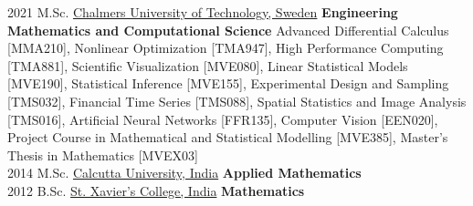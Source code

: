 \documentclass[letterpaper]{templatecv} %
\begin{document}
\begin{twenty} 
	\twentyitem
    	{2021}%
        {}%
        {M.Sc.}
        {\href{https://www.chalmers.se/en/Pages/default.aspx}{Chalmers University of Technology, Sweden}}
        {\textbf{Engineering Mathematics and Computational Science}}
        {Advanced Differential Calculus [MMA210], Nonlinear Optimization [TMA947], High Performance Computing [TMA881], Scientific Visualization [MVE080], Linear Statistical Models  [MVE190], Statistical Inference [MVE155], %
        Experimental Design and Sampling [TMS032], Financial Time Series [TMS088], 
        Spatial Statistics and Image Analysis [TMS016], %
        Artificial Neural Networks [FFR135], %
        Computer Vision [EEN020], Project Course in Mathematical and Statistical Modelling [MVE385], Master's Thesis in Mathematics [MVEX03]}\\
	\twentyitem
    	{2014}%
		{}%
        {M.Sc.}
        {\href{https://www.caluniv.ac.in/}{Calcutta University, India}}
        {\textbf{Applied Mathematics}}
        {%
        }\\
        \twentyitem
    	{2012}%
		{}%
        {B.Sc.}
         {\href{https://www.sxccal.edu/}{St. Xavier's College, India}}
 {\textbf{Mathematics}}
        {%
        }

\end{twenty}
\end{document}
